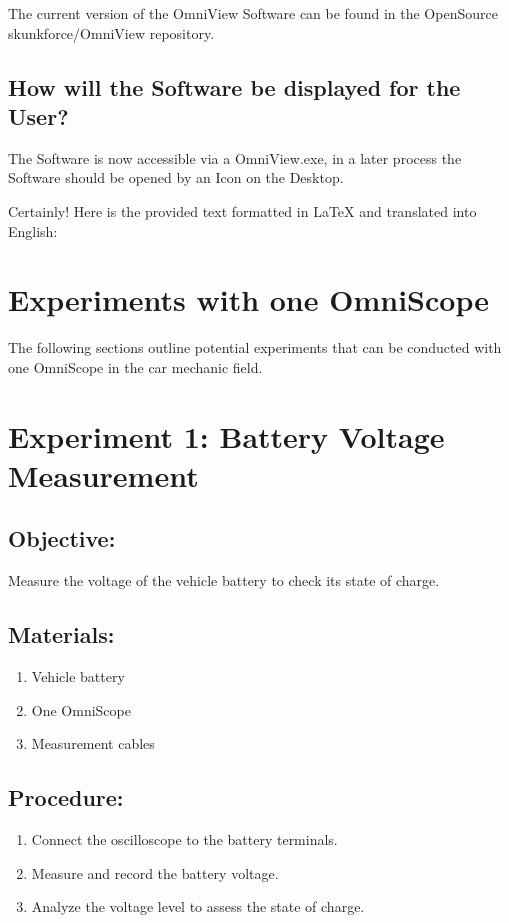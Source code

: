 \documentclass[]{scrreprt}
\begin{document}
\begin{itemize}
    The current version of the OmniView Software can be found in the OpenSource skunkforce/OmniView repository.

    \subsection{How will the Software be displayed for the User?}

    The Software is now accessible via a OmniView.exe, in a later process the Software should be opened by an Icon on the Desktop. 

    Certainly! Here is the provided text formatted in LaTeX and translated into English:

    \section{Experiments with one OmniScope}
    The following sections outline potential experiments that can be conducted with one OmniScope in the car mechanic field. 

    \section*{Experiment 1: Battery Voltage Measurement}
    \subsection*{Objective:} Measure the voltage of the vehicle battery to check its state of charge.
    \subsection*{Materials:}
    \begin{enumerate}
        \item Vehicle battery
        \item One OmniScope
        \item Measurement cables
    \end{enumerate}
    \subsection*{Procedure:}
    \begin{enumerate}
        \item Connect the oscilloscope to the battery terminals.
        \item Measure and record the battery voltage.
        \item Analyze the voltage level to assess the state of charge.
    \end{enumerate}


\end{itemize}
\end{document}

